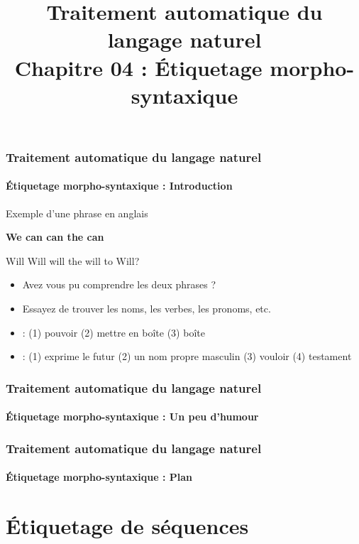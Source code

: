 \documentclass[xcolor=table]{beamer}
\title[TALN : 04- Étiquetage morpho-syntaxique]%
{Traitement automatique du langage naturel\\Chapitre 04 : Étiquetage morpho-syntaxique}
\begin{document}
	
\begin{frame}
\frametitle{Traitement automatique du langage naturel}
\framesubtitle{Étiquetage morpho-syntaxique : Introduction}

\begin{exampleblock}{Exemple d'une phrase en anglais}
	\begin{center}
		\Huge\bfseries
		We can can the can
		
		Will Will will the will to Will?
	\end{center}
\end{exampleblock}

\begin{itemize}
	\item Avez vous pu comprendre  les deux phrases ?
	\item Essayez de trouver les noms, les verbes, les pronoms, etc.
	\item {} : (1) pouvoir (2) mettre en boîte (3) boîte
	\item {} : (1) exprime le futur (2) un nom propre masculin (3) vouloir (4) testament
\end{itemize}

\end{frame}

\begin{frame}
\frametitle{Traitement automatique du langage naturel}
\framesubtitle{Étiquetage morpho-syntaxique : Un peu d'humour}

\begin{center}
\end{center}

\end{frame}

\begin{frame}
\frametitle{Traitement automatique du langage naturel}
\framesubtitle{Étiquetage morpho-syntaxique : Plan}

\begin{multicols}{2}
\tableofcontents
\end{multicols}
\end{frame}

\section{Étiquetage de séquences}
\end{document}
